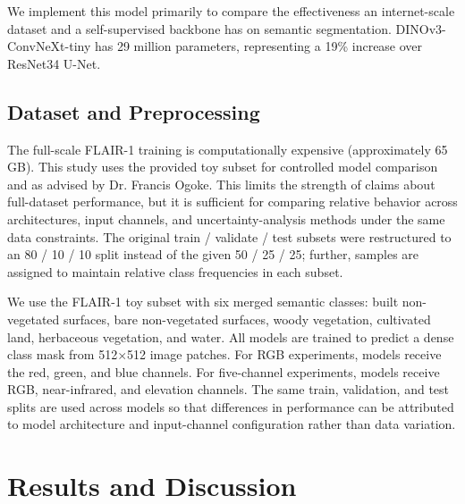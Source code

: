 \documentclass{article}
\begin{document}
We implement this model primarily to compare the effectiveness an internet-scale dataset and a self-supervised backbone has on semantic segmentation. DINOv3-ConvNeXt-tiny has 29 million parameters, representing a 19\% increase over ResNet34 U-Net.

\subsection{Dataset and Preprocessing}
The full-scale FLAIR-1 training is computationally expensive (approximately 65 GB). This study uses the provided toy subset for controlled model comparison and as advised by Dr. Francis Ogoke. This limits the strength of claims about full-dataset performance, but it is sufficient for comparing relative behavior across architectures, input channels, and uncertainty-analysis methods under the same data constraints. The original train / validate / test subsets were restructured to an 80 / 10 / 10 split instead of the given 50 / 25 / 25; further, samples are assigned to maintain relative class frequencies in each subset.

We use the FLAIR-1 toy subset with six merged semantic classes: built non-vegetated surfaces, bare non-vegetated surfaces, woody vegetation, cultivated land, herbaceous vegetation, and water. All models are trained to predict a dense class mask from 512$\times$512 image patches. For RGB experiments, models receive the red, green, and blue channels. For five-channel experiments, models receive RGB, near-infrared, and elevation channels. The same train, validation, and test splits are used across models so that differences in performance can be attributed to model architecture and input-channel configuration rather than data variation.


\section{Results and Discussion}

\end{document}
